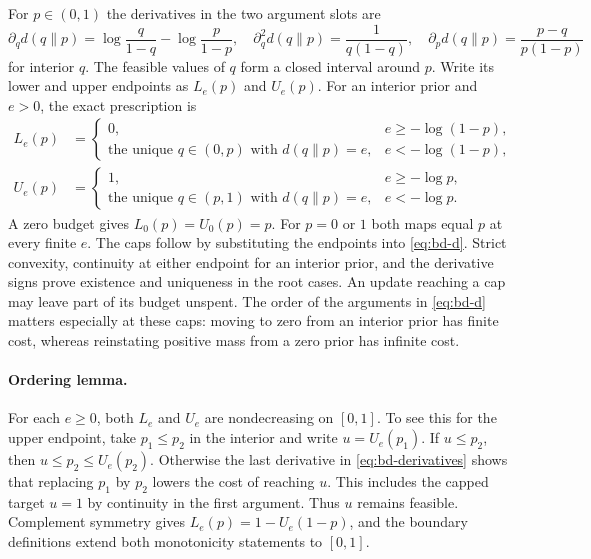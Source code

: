 \documentclass[12pt,letterpaper]{article}
\begin{document}
For $p\in(0,1)$ the derivatives in the two argument slots are
\begin{equation}
 \partial_q d(q\|p)=\log\frac{q}{1-q}-\log\frac{p}{1-p},
 \quad
 \partial_q^2 d(q\|p)=\frac{1}{q(1-q)},
 \quad
 \partial_p d(q\|p)=\frac{p-q}{p(1-p)}
 \label{eq:bd-derivatives}
\end{equation}
for interior $q$. The feasible values of $q$ form a closed interval around $p$. Write its lower and upper endpoints as $L_e(p)$ and $U_e(p)$. For an interior prior and $e>0$, the exact prescription is
\begin{align}
 L_e(p)&=
 \begin{cases}
 0,&e\geq -\log(1-p),\\
 \text{the unique }q\in(0,p)\text{ with }d(q\|p)=e,&e<-\log(1-p),
 \end{cases}\label{eq:bd-one-lo}\\
 U_e(p)&=
 \begin{cases}
 1,&e\geq -\log p,\\
 \text{the unique }q\in(p,1)\text{ with }d(q\|p)=e,&e<-\log p .
 \end{cases}\label{eq:bd-one-hi}
\end{align}
A zero budget gives $L_0(p)=U_0(p)=p$. For $p=0$ or $1$ both maps equal $p$ at every finite $e$. The caps follow by substituting the endpoints into \eqref{eq:bd-d}. Strict convexity, continuity at either endpoint for an interior prior, and the derivative signs prove existence and uniqueness in the root cases. An update reaching a cap may leave part of its budget unspent. The order of the arguments in \eqref{eq:bd-d} matters especially at these caps: moving to zero from an interior prior has finite cost, whereas reinstating positive mass from a zero prior has infinite cost.

\paragraph{Ordering lemma.}
For each $e\geq 0$, both $L_e$ and $U_e$ are nondecreasing on $[0,1]$. To see this for the upper endpoint, take $p_1\leq p_2$ in the interior and write $u=U_e(p_1)$. If $u\leq p_2$, then $u\leq p_2\leq U_e(p_2)$. Otherwise the last derivative in \eqref{eq:bd-derivatives} shows that replacing $p_1$ by $p_2$ lowers the cost of reaching $u$. This includes the capped target $u=1$ by continuity in the first argument. Thus $u$ remains feasible. Complement symmetry gives $L_e(p)=1-U_e(1-p)$, and the boundary definitions extend both monotonicity statements to $[0,1]$.
\end{document}
